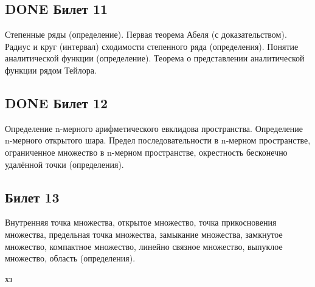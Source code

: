 \documentclass[11pt]{article}
\begin{document}
\subsection{{\bfseries\sffamily DONE} Билет 11}
\label{sec:orga36ee52}
Степенные ряды (определение). Первая теорема Абеля (с доказательством). Радиус и круг (интервал) сходимости степенного ряда (определения). Понятие аналитической функции (определение). Теорема о представлении аналитической функции рядом Тейлора.


\subsection{{\bfseries\sffamily DONE} Билет 12}
\label{sec:org87987be}
Определение n-мерного арифметического евклидова пространства. Определение n-мерного открытого шара. Предел последовательности в n-мерном пространстве, ограниченное множество  в n-мерном пространстве, окрестность бесконечно удалённой точки (определения).


\subsection{Билет 13}
\label{sec:org97bf4a7}
Внутренняя точка множества, открытое множество, точка прикосновения множества, предельная точка множества, замыкание множества, замкнутое множество, компактное множество, линейно связное множество, выпуклое множество, область (определения).

хз
\end{document}
